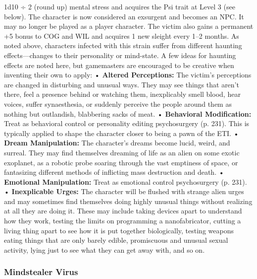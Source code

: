 1d10 ÷ 2 (round up) mental stress and acquires 
the Psi trait at Level 3 (see below). The character 
is now considered an exsurgent and becomes 
an NPC. It may no longer be played as a player 
character. The victim also gains a permanent 
+5 bonus to COG and WIL and acquires 1 new 
sleight every 1–2 months.
As noted above, characters infected with this strain 
suffer from different haunting effects—changes 
to their personality or mind-state. A few ideas for 
haunting effects are noted here, but gamemasters are 
encouraged to be creative when inventing their own 
to apply:
•  \textbf{Altered Perceptions:} The victim's perceptions are 
changed in disturbing and unusual ways. They 
may see things that aren't there, feel a presence 
behind or watching them, inexplicably smell 
blood, hear voices, suffer synaesthesia, or suddenly
perceive the people around them as nothing
but outlandish, blabbering sacks of meat.
• \textbf{Behavioral Modification:} Treat as behavioral control
or personality editing psychosurgery (p. 231).
This is typically applied to shape the character 
closer to being a pawn of the ETI.
•  \textbf{Dream Manipulation:} The character's dreams 
become lucid, weird, and surreal. They may find 
themselves dreaming of life as an alien on some 
exotic exoplanet, as a robotic probe soaring 
through the vast emptiness of space, or fantasizing
different methods of inflicting mass destruction
and death.
•  \textbf{Emotional Manipulation:} Treat as emotional 
control psychosurgery (p. 231). 
•  \textbf{Inexplicable Urges:} The character will be flushed 
with strange alien urges and may sometimes find 
themselves doing highly unusual things without 
realizing at all they are doing it. These may include
taking devices apart to understand how
they work, testing the limits on programming a 
nanofabricator, cutting a living thing apart to see 
how it is put together biologically, testing weapons
eating things that are only barely edible, promiscuous
and unusual sexual activity, lying just
to see what they can get away with, and so on.

\subsubsection{Mindstealer Virus}

